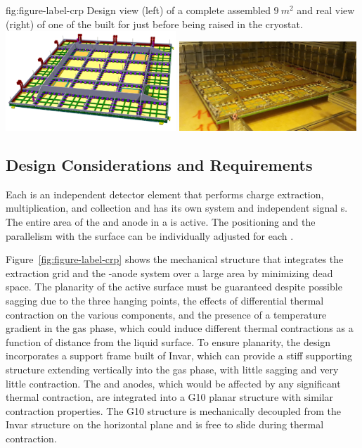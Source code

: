 \begin{dunefigure}
{fig:figure-label-crp}
{Design view (left) of a complete assembled  $\SI{9}{m^{2}}$  and real view (right) of one of the  built for  just before being raised in the cryostat.}
\includegraphics[width=0.48\textwidth]{graphics/CRP-fig1}
\includegraphics[width=0.50\textwidth]{graphics/CRP2-incryostatredim}
\end{dunefigure}

 

\subsection{Design Considerations and Requirements}
\label{ch:dp-crp-consider-requirements}

Each  is an independent detector element that performs charge extraction, multiplication, and collection and has its own  system and independent signal \fdth{}s. The entire area of the  and anode in a  is active. The positioning and the parallelism with the  surface can be individually adjusted for each .

Figure~\ref{fig:figure-label-crp} shows the  mechanical structure that integrates the extraction grid and the -anode system over a large area by minimizing dead space. The planarity of the active surface must be guaranteed despite possible sagging due to the three hanging points, the effects of differential thermal contraction on the various  components, and the presence of a temperature gradient in the gas phase, which could induce different thermal contractions as a function of distance from the liquid surface. To ensure planarity, the design  incorporates a support frame built of Invar, which can provide a stiff supporting structure extending vertically into the gas phase, with little sagging and very little contraction. The  and anodes, which would be affected by any significant thermal contraction, are integrated into a G10 planar structure with similar contraction properties. The G10 structure is mechanically decoupled from the Invar structure on the horizontal plane and is free to slide during thermal contraction.

